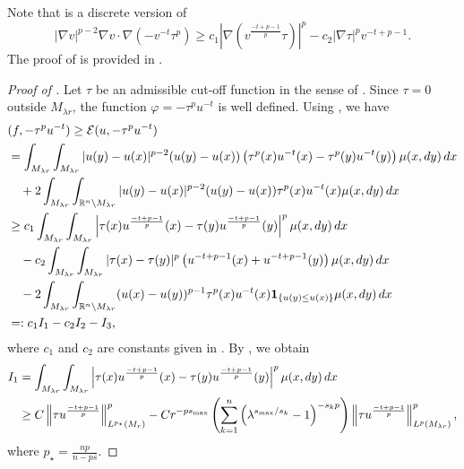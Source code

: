 \documentclass[11pt]{amsart}
\theoremstyle{plain}
\theoremstyle{definition}
\numberwithin{equation}{section}
\renewcommand{\d}{\textnormal{d}}
\begin{document}
Note that  is a discrete version of 
\begin{equation*}
|\nabla v|^{p-2} \nabla v \cdot \nabla (-v^{-t}\tau^p) \geq c_1 \left| \nabla \left(v^{\frac{-t+p-1}{p}} \tau \right) \right|^p - c_2 |\nabla \tau|^p v^{-t+p-1}.
\end{equation*}
The proof of  is provided in .

\begin{proof} [Proof of ]
Let $\tau$ be an admissible cut-off function in the sense of . Since $\tau = 0$ outside $M_{\lambda r}$, the function $\varphi = -\tau^p u^{-t}$ is well defined. Using , we have
\begin{equation*}
\begin{split}
&(f, -\tau^p u^{-t}) \geq \mathcal{E}(u, -\tau^p u^{-t}) \\
&= \int_{M_{\lambda r}} \int_{M_{\lambda r}} |u(y)-u(x)|^{p-2} (u(y)-u(x)) \left( \tau^p(x) u^{-t}(x) - \tau^p(y) u^{-t}(y) \right) \mu(x, \d y)\, \d x \\
&\quad + 2 \int_{M_{\lambda r}} \int_{\mathbb{R}^n \setminus M_{\lambda r}} |u(y)-u(x)|^{p-2} (u(y)-u(x)) \tau^p(x) u^{-t}(x) \mu(x, \d y)\, \d x \\
&\geq c_1 \int_{M_{\lambda r}} \int_{M_{\lambda r}} \left| \tau(x) u^{\frac{-t+p-1}{p}} (x) - \tau(y) u^{\frac{-t+p-1}{p}}(y) \right|^p \mu(x, \d y)\, \d x \\
&\quad - c_2 \int_{M_{\lambda r}} \int_{M_{\lambda r}} |\tau(x)-\tau(y)|^p \left( u^{-t+p-1}(x) + u^{-t+p-1}(y) \right) \mu(x, \d y)\, \d x \\
&\quad - 2 \int_{M_{\lambda r}} \int_{\mathbb{R}^n \setminus M_{\lambda r}} (u(x)-u(y))^{p-1} \tau^p(x) u^{-t}(x) {\bf 1}_{\lbrace u(y) \leq u(x) \rbrace} \mu(x, \d y)\, \d x \\
&=: c_1 I_1 - c_2 I_2 - I_3,
\end{split}
\end{equation*}
where $c_1$ and $c_2$ are constants given in . 
By , we obtain
\begin{equation*}
\begin{split}
I_1
&= \int_{M_{\lambda r}} \int_{M_{\lambda r}} \left| \tau(x) u^{\frac{-t+p-1}{p}} (x) - \tau(y) u^{\frac{-t+p-1}{p}}(y) \right|^p \mu(x, \d y)\, \d x \\
&\geq C\left\|\tau u^{\frac{-t+p-1}{p}} \right\|_{L^{p_{\star}}(M_{r})}^p -C r^{-ps_{\max}}\left( \sum_{k=1}^n \left( \lambda^{s_{\max}/s_k}-1 \right)^{-s_k p} \right) \left\|\tau u^{\frac{-t+p-1}{p}}\right\|_{L^p(M_{\lambda r})}^p,
\end{split}
\end{equation*}
where
$ p_{\star} = \frac{np}{n-p\bar{s}}$.


\end{proof}
\end{document}
